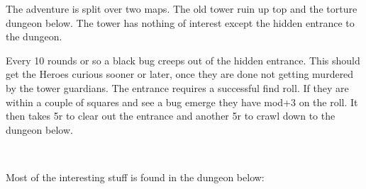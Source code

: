 The adventure is split over two maps. The old tower ruin up top and the torture dungeon below. The tower has nothing of interest except the hidden entrance to the dungeon. 

Every 10 rounds or so a black bug creeps out of the hidden entrance. This should get the Heroes curious sooner or later, once they are done not getting murdered by the tower guardians. The entrance requires a successful find roll. If they are within a couple of squares and see a bug emerge they have mod+3 on the roll. It then takes 5r to clear out the entrance and another 5r to crawl down to the dungeon below.

\

\noindent Most of the interesting stuff is found in the dungeon below:

